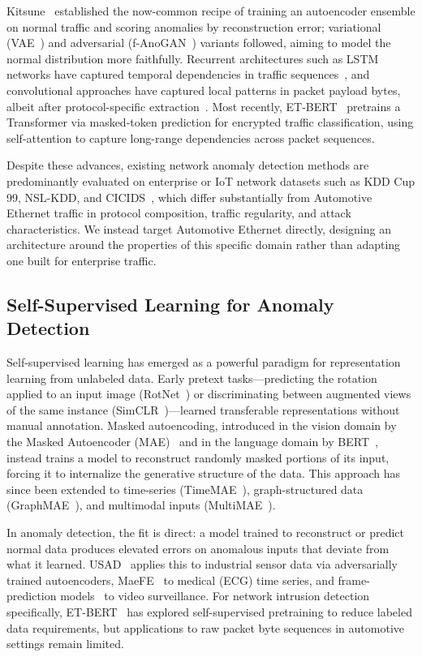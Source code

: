 Kitsune~\cite{mirsky2018kitsune} established the now-common recipe of training an autoencoder ensemble on normal traffic and scoring anomalies by reconstruction error; variational (VAE~\cite{kingma2014auto}) and adversarial (f-AnoGAN~\cite{schlegl2017anogan}) variants followed, aiming to model the normal distribution more faithfully. Recurrent architectures such as LSTM networks have captured temporal dependencies in traffic sequences~\cite{kim2016lstm}, and convolutional approaches have captured local patterns in packet payload bytes, albeit after protocol-specific extraction~\cite{jeong2021convolutional}. Most recently, ET-BERT~\cite{lin2022bert} pretrains a Transformer via masked-token prediction for encrypted traffic classification, using self-attention to capture long-range dependencies across packet sequences.

Despite these advances, existing network anomaly detection methods are predominantly evaluated on enterprise or IoT network datasets such as KDD Cup 99, NSL-KDD, and CICIDS~\cite{tavallaee2009detailed, sharafaldin2018toward}, which differ substantially from Automotive Ethernet traffic in protocol composition, traffic regularity, and attack characteristics. We instead target Automotive Ethernet directly, designing an architecture around the properties of this specific domain rather than adapting one built for enterprise traffic.

\subsection{Self-Supervised Learning for Anomaly Detection}
Self-supervised learning has emerged as a powerful paradigm for representation learning from unlabeled data. Early pretext tasks---predicting the rotation applied to an input image (RotNet~\cite{gidaris2018unsupervised}) or discriminating between augmented views of the same instance (SimCLR~\cite{chen2020simclr})---learned transferable representations without manual annotation. Masked autoencoding, introduced in the vision domain by the Masked Autoencoder (MAE)~\cite{he2022masked} and in the language domain by BERT~\cite{devlin2019bert}, instead trains a model to reconstruct randomly masked portions of its input, forcing it to internalize the generative structure of the data. This approach has since been extended to time-series (TimeMAE~\cite{cheng2026timemae}), graph-structured data (GraphMAE~\cite{hou2022graphmae}), and multimodal inputs (MultiMAE~\cite{bachmann2022multimae}).

In anomaly detection, the fit is direct: a model trained to reconstruct or predict normal data produces elevated errors on anomalous inputs that deviate from what it learned. USAD~\cite{audibert2020usad} applies this to industrial sensor data via adversarially trained autoencoders, MaeFE~\cite{zhang2022maefe} to medical (ECG) time series, and frame-prediction models~\cite{liu2018future} to video surveillance. For network intrusion detection specifically, ET-BERT~\cite{lin2022bert} has explored self-supervised pretraining to reduce labeled data requirements, but applications to raw packet byte sequences in automotive settings remain limited.


